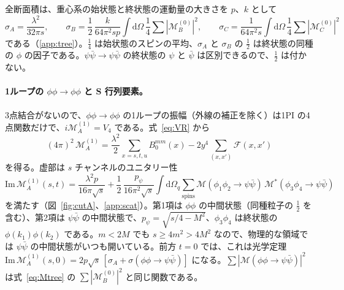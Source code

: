\documentclass[a4paper,10pt]{ltjsarticle}
\newcommand{\dd}{\mathrm{d}}
\begin{document}
全断面積は、重心系の始状態と終状態の運動量の大きさを $p$、$k$ として
\begin{equation}
\sigma_A=\frac{\lambda^2}{32\pi s},\qquad
\sigma_B=\frac12\,\frac{k}{64\pi^2sp}\int\!\dd\Omega\,\frac14\sum|\mathcal M_B^{(0)}|^2,\qquad
\sigma_C=\frac{1}{64\pi^2s}\int\!\dd\Omega\,\frac14\sum|\mathcal M_C^{(0)}|^2
\label{eq:sigma}
\end{equation}
である（\ref{app:tree}）。$\frac14$ は始状態のスピンの平均、$\sigma_A$ と $\sigma_B$ の $\frac12$ は終状態の同種の $\phi$ の因子である。$\psi\bar\psi\to\psi\bar\psi$ の終状態の $\psi$ と $\bar\psi$ は区別できるので、$\frac12$ は付かない。

\paragraph{1ループの $\phi\phi\to\phi\phi$ と S 行列要素。}3点結合がないので、$\phi\phi\to\phi\phi$ の1ループの振幅（外線の補正を除く）は1PI の4点関数だけで、$i\mathcal M_A^{(1)}=V_4$ である。式~\eqref{eq:VR} から
\begin{equation}
(4\pi)^2\,\mathcal M_A^{(1)}=\frac{\lambda^2}{2}\sum_{x=s,t,u}B_0^{mm}(x)-2y^4\sum_{(x,x')}\mathcal F(x,x')
\label{eq:M1}
\end{equation}
を得る。虚部は $s$ チャンネルのユニタリー性
\begin{equation}
\mathrm{Im}\,\mathcal M_A^{(1)}(s,t)=\frac{\lambda^2p}{16\pi\sqrt s}
+\frac12\,\frac{p_\psi}{16\pi^2\sqrt s}\int\!\dd\Omega_q\sum_{\mathrm{spins}}\mathcal M(\phi_1\phi_2\to\psi\bar\psi)\,\mathcal M^*(\phi_3\phi_4\to\psi\bar\psi)
\label{eq:unit}
\end{equation}
を満たす（図~\ref{fig:cutA}、\ref{app:scat}）。第1項は $\phi\phi$ の中間状態（同種粒子の $\frac12$ を含む）、第2項は $\psi\bar\psi$ の中間状態で、$p_\psi=\sqrt{s/4-M^2}$、$\phi_3\phi_4$ は終状態の $\phi(k_1)\phi(k_2)$ である。$m<2M$ でも $s\ge4m^2>4M^2$ なので、物理的な領域では $\psi\bar\psi$ の中間状態がいつも開いている。前方 $t=0$ では、これは光学定理 $\mathrm{Im}\,\mathcal M_A^{(1)}(s,0)=2p\sqrt s\,[\sigma_A+\sigma(\phi\phi\to\psi\bar\psi)]$ になる。$\sum|\mathcal M(\phi\phi\to\psi\bar\psi)|^2$ は式~\eqref{eq:Mtree} の $\sum|\mathcal M_B^{(0)}|^2$ と同じ関数である。
\end{document}
